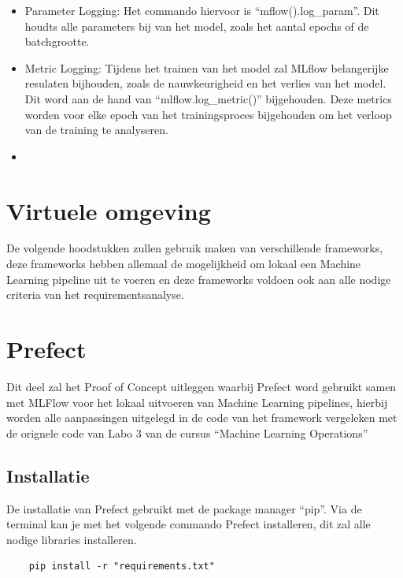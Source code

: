 \begin{itemize}
    \item Parameter Logging: Het commando hiervoor is ``mflow().log\_param''. Dit houdts alle parameters bij van het model, zoals het aantal epochs of de batchgrootte.
    \item Metric Logging: Tijdens het trainen van het model zal MLflow belangerijke resulaten bijhouden, zoals de nauwkeurigheid en het verlies van het model. Dit word aan de hand van ``mlflow.log\_metric()'' bijgehouden. Deze metrics worden voor elke epoch van het trainingsproces bijgehouden om het verloop van de training te analyseren.
    \item 
\end{itemize}

\section{Virtuele omgeving}
De volgende hoodstukken zullen gebruik maken van verschillende frameworks, deze frameworks hebben allemaal de mogelijkheid om lokaal een Machine Learning pipeline uit te voeren en deze frameworks voldoen ook aan alle nodige criteria van het requirementsanalyse.
\section{Prefect}
Dit deel zal het Proof of Concept uitleggen waarbij Prefect word gebruikt samen met MLFlow voor het lokaal uitvoeren van Machine Learning pipelines, hierbij worden alle aanpassingen uitgelegd in de code van het framework vergeleken met de orignele code van Labo 3 van de cursus ``Machine Learning Operations''
\subsection{Installatie}
De installatie van Prefect gebruikt met de package manager ``pip''. Via de terminal kan je met het volgende commando Prefect installeren, dit zal alle nodige libraries installeren.
\begin{verbatim}
    pip install -r "requirements.txt"
\end{verbatim}
